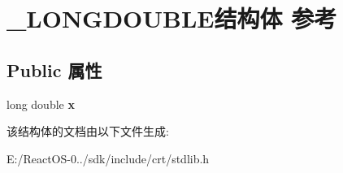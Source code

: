 \hypertarget{struct___l_o_n_g_d_o_u_b_l_e}{}\section{\+\_\+\+L\+O\+N\+G\+D\+O\+U\+B\+L\+E结构体 参考}
\label{struct___l_o_n_g_d_o_u_b_l_e}
\subsection*{Public 属性}
\begin{DoxyCompactItemize}
\item 
\mbox{\label{struct___l_o_n_g_d_o_u_b_l_e_a265d2ae9eb1fe87a46e3341f689bb352}} 
long double {\bfseries x}
\end{DoxyCompactItemize}


该结构体的文档由以下文件生成\+:\begin{DoxyCompactItemize}
\item 
E\+:/\+React\+O\+S-\/0../sdk/include/crt/stdlib.\+h\end{DoxyCompactItemize}

